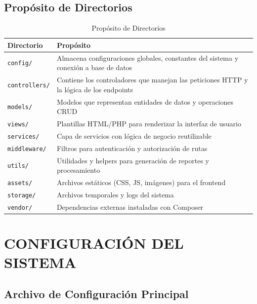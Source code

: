 \documentclass[12pt, a4paper]{report}
\begin{document}
\section{Propósito de Directorios}

\begin{table}[H]
\centering
\begin{tabularx}{\textwidth}{|l|X|}
\hline
\textbf{Directorio} & \textbf{Propósito} \\
\hline
\texttt{config/} & Almacena configuraciones globales, constantes del sistema y conexión a base de datos \\
\hline
\texttt{controllers/} & Contiene los controladores que manejan las peticiones HTTP y la lógica de los endpoints \\
\hline
\texttt{models/} & Modelos que representan entidades de datos y operaciones CRUD \\
\hline
\texttt{views/} & Plantillas HTML/PHP para renderizar la interfaz de usuario \\
\hline
\texttt{services/} & Capa de servicios con lógica de negocio reutilizable \\
\hline
\texttt{middleware/} & Filtros para autenticación y autorización de rutas \\
\hline
\texttt{utils/} & Utilidades y helpers para generación de reportes y procesamiento \\
\hline
\texttt{assets/} & Archivos estáticos (CSS, JS, imágenes) para el frontend \\
\hline
\texttt{storage/} & Archivos temporales y logs del sistema \\
\hline
\texttt{vendor/} & Dependencias externas instaladas con Composer \\
\hline
\end{tabularx}
\caption{Propósito de Directorios}
\end{table}

\chapter{CONFIGURACIÓN DEL SISTEMA}

\section{Archivo de Configuración Principal}
\end{document}
